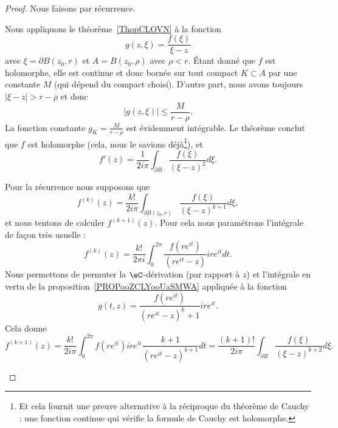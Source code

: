 \begin{proof}
	Nous faisons par récurrence.
	\begin{subproof}
		Nous appliquons le théorème~\ref{ThopCLOVN} à la fonction
		\begin{equation}
			g(z,\xi)=\frac{ f(\xi) }{ \xi-z }
		\end{equation}
		avec \( \xi=\partial B(z_0,r)\) et \( A=B(z_0,\rho)\) avec \( \rho<r\). Étant donné que \( f\) est holomorphe, elle est continue et donc bornée sur tout compact \( K\subset A\) par une constante \( M\) (qui dépend du compact choisi).  D'autre part, nous avons toujours \( | \xi-z |>r-\rho\) et donc
		\begin{equation}
			| g(z,\xi) |\leq \frac{ M }{ r-\rho }.
		\end{equation}
		La fonction constante \( g_K=\frac{ M }{ r-\rho }\) est évidemment intégrable. Le théorème conclut que \( f\) est holomorphe (cela, nous le savions déjà\footnote{Et cela fournit une preuve alternative à la réciproque du théorème de Cauchy : une fonction continue qui vérifie la formule de Cauchy est holomorphe.}), et
		\begin{equation}
			f'(z)=\frac{1}{ 2i\pi }\int_{\partial B}\frac{ f(\xi) }{ (\xi-z)^2 }d\xi.
		\end{equation}

		Pour la récurrence\cite{ooKZJHooZhNpkf} nous supposons que
		\begin{equation}
			f^{(k)}(z)=\frac{k!}{ 2i\pi }\int_{\partial B(z_0,r)}\frac{ f(\xi) }{ (\xi-z)^{k+1} }d\xi,
		\end{equation}
		et nous tentons de calculer \( f^{(k+1)}(z)\). Pour cela nous paramétrons l'intégrale de façon très usuelle :
		\begin{equation}
			f^{(k)}(z)=\frac{ k! }{ 2\pi i }\int_0^{2\pi}\frac{ f(r e^{it}) }{ (r e^{it}-z) }ir e^{it}dt.
		\end{equation}
		Nous permettons de permuter la \( \eC\)-dérivation (par rapport à \( z\)) et l'intégrale en vertu de la proposition~\ref{PROPooZCLYooUaSMWA} appliquée à la fonction
		\begin{equation}
			g(t,z)=\frac{ f(r e^{it}) }{ (r e^{it}-z)^k+1 }ir e^{it}.
		\end{equation}
		Cela donne
		\begin{equation}
			f^{(k+1)}(z)=\frac{ k! }{ 2i\pi }\int_0^{2\pi}f(r e^{it})ir e^{it}\frac{ k+1 }{ (r e^{it}-z)^{k+1} }dt=\frac{ (k+1)! }{ 2i\pi }\int_{\partial B}\frac{ f(\xi) }{ (\xi-z)^{k+2} }d\xi.
		\end{equation}
	\end{subproof}
\end{proof}

